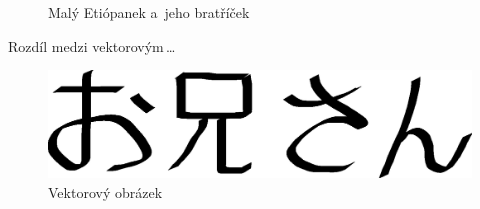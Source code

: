 \documentclass[11pt,a4paper]{article}
\begin{document}
\begin{figure}[htb]
{            
        }
        \caption{Malý Etiópanek a~jeho bratříček}
        \label{figure:etiopan}
    \end{figure}

    \pagebreak
    \newpage
    Rozdíl medzi vektorovým\,\dots
    \begin{figure}[htb]
        \centering
        \includegraphics[scale=0.4]{oniisan}
        \caption{Vektorový obrázek}
        \label{figure:vektor}
    \end{figure}
\end{document}
